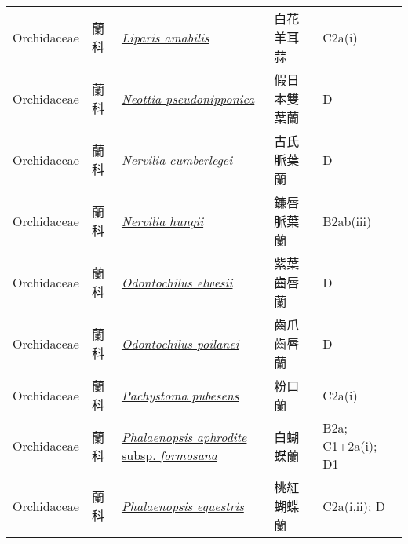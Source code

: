 {\begin{longtable}{L{2.5cm}L{2cm}L{5cm}L{2.5cm}L{3cm}}
    Orchidaceae & 蘭科 & \href{http://www.theplantlist.org/tpl1.1/search?q=Liparis+amabilis}{\textit{Liparis amabilis} } & 白花羊耳蒜 & C2a(i)    \\
    Orchidaceae & 蘭科 & \href{http://www.theplantlist.org/tpl1.1/search?q=Neottia+pseudonipponica}{\textit{Neottia pseudonipponica} } & 假日本雙葉蘭 & D    \\
    Orchidaceae & 蘭科 & \href{http://www.theplantlist.org/tpl1.1/search?q=Nervilia+cumberlegei}{\textit{Nervilia cumberlegei} } & 古氏脈葉蘭 & D    \\
    Orchidaceae & 蘭科 & \href{http://www.theplantlist.org/tpl1.1/search?q=Nervilia+hungii}{\textit{Nervilia hungii} } & 鐮唇脈葉蘭 & B2ab(iii)    \\
    Orchidaceae & 蘭科 & \href{http://www.theplantlist.org/tpl1.1/search?q=Odontochilus+elwesii}{\textit{Odontochilus elwesii} } & 紫葉齒唇蘭 & D    \\
    Orchidaceae & 蘭科 & \href{http://www.theplantlist.org/tpl1.1/search?q=Odontochilus+poilanei}{\textit{Odontochilus poilanei} } & 齒爪齒唇蘭 & D    \\
    Orchidaceae & 蘭科 & \href{http://www.theplantlist.org/tpl1.1/search?q=Pachystoma+pubesens}{\textit{Pachystoma pubesens} } & 粉口蘭 & C2a(i)    \\
    Orchidaceae & 蘭科 & \href{http://www.theplantlist.org/tpl1.1/search?q=Phalaenopsis+aphrodite+subsp.+formosana}{\textit{Phalaenopsis aphrodite} subsp. \textit{formosana} } & 白蝴蝶蘭 & B2a; C1+2a(i); D1    \\
    Orchidaceae & 蘭科 & \href{http://www.theplantlist.org/tpl1.1/search?q=Phalaenopsis+equestris}{\textit{Phalaenopsis equestris} } & 桃紅蝴蝶蘭 & C2a(i,ii); D    \\

\end{longtable}}
